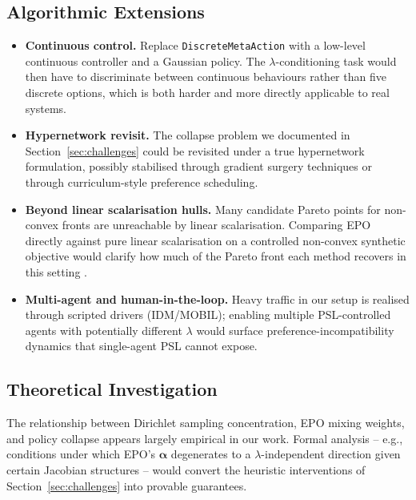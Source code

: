\documentclass[12pt, letterpaper]{article}
\begin{document}
\subsection{Algorithmic Extensions}
\begin{itemize}
    \item \textbf{Continuous control.} Replace \texttt{DiscreteMetaAction} with a low-level continuous controller and a Gaussian policy. The $\lambda$-conditioning task would then have to discriminate between continuous behaviours rather than five discrete options, which is both harder and more directly applicable to real systems.
    \item \textbf{Hypernetwork revisit.} The collapse problem we documented in Section~\ref{sec:challenges} could be revisited under a true hypernetwork formulation, possibly stabilised through gradient surgery techniques \cite{sener2018multitask,lin2019pareto} or through curriculum-style preference scheduling.
    \item \textbf{Beyond linear scalarisation hulls.} Many candidate Pareto points for non-convex fronts are unreachable by linear scalarisation. Comparing EPO directly against pure linear scalarisation on a controlled non-convex synthetic objective would clarify how much of the Pareto front each method recovers in this setting \cite{boyd2004convex,roijers2013survey}.
    \item \textbf{Multi-agent and human-in-the-loop.} Heavy traffic in our setup is realised through scripted drivers (IDM/MOBIL); enabling multiple PSL-controlled agents with potentially different $\lambda$ would surface preference-incompatibility dynamics that single-agent PSL cannot expose.
\end{itemize}

\subsection{Theoretical Investigation}
The relationship between Dirichlet sampling concentration, EPO mixing weights, and policy collapse appears largely empirical in our work. Formal analysis -- e.g., conditions under which EPO's $\bm{\alpha}$ degenerates to a $\lambda$-independent direction given certain Jacobian structures -- would convert the heuristic interventions of Section~\ref{sec:challenges} into provable guarantees.
\end{document}
